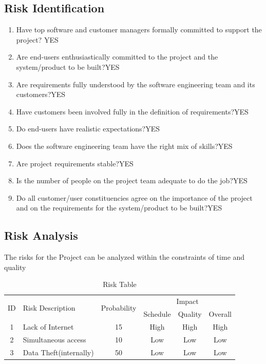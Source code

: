 \documentclass[oneside,a4paper,12pt]{book}
\begin{document}
\subsection{Risk Identification}

\begin{enumerate}
\item Have top software and customer managers formally committed to support the project?	YES
\item Are end-users enthusiastically committed to the project and the system/product to be built?YES
\item Are requirements fully understood by the software engineering team and its customers?YES
\item Have customers been involved fully in the definition of requirements?YES
\item Do end-users have realistic expectations?YES
\item Does the software engineering team have the right mix of skills?YES
\item Are project requirements stable?YES
\item Is the number of people on the project team adequate to do the job?YES
\item Do all customer/user constituencies agree on the importance of the project and on the requirements for the system/product to be built?YES
\end{enumerate}

\subsection{Risk Analysis}
The risks for the Project can be analyzed within the constraints of time and quality

\begin{table}[!htbp]
\begin{center}
\def\arraystretch{1.5}
\begin{tabularx}{\textwidth}{| c | X | c | c | c | c |}
\hline
\multirow{2}{*}{ID} & \multirow{2}{*}{Risk Description}	& \multirow{2}{*}{Probability} & \multicolumn{3}{|c|}{Impact} \\ \cline{4-6}
	& & &	Schedule	& Quality	& Overall \\ \hline
1	& Lack of Internet 	& 15	& High	& High	& High \\ \hline
2	& Simultaneous access	& 10	& Low	& Low	& Low \\ \hline
3	& Data Theft(internally)	& 50	& Low	& Low	& Low \\ \hline
\end{tabularx}
\end{center}
\caption{Risk Table}
\label{tab:risk}
\end{table}
\end{document}
